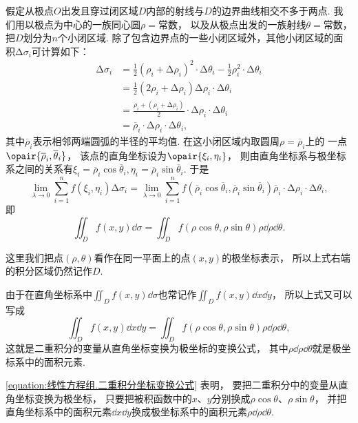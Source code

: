 假定从极点\(O\)出发且穿过闭区域\(D\)内部的射线与\(D\)的边界曲线相交不多于两点.
我们用以极点为中心的一族同心圆\(\rho = \text{常数}\)，
以及从极点出发的一族射线\(\theta = \text{常数}\)，
把\(D\)划分为\(n\)个小闭区域.
除了包含边界点的一些小闭区域外，其他小闭区域的面积\(\increment\sigma_i\)可计算如下：
\begin{align*}
	\increment\sigma_i
	&= \frac{1}{2} (\rho_i+\increment\rho_i)^2 \cdot \increment\theta_i
	- \frac{1}{2} \rho_i^2 \cdot \increment\theta_i \\
	&= \frac{1}{2} (2\rho_i + \increment\rho_i) \increment\rho_i \cdot \increment\theta_i \\
	&= \frac{\rho_i + (\rho_i+\increment\rho_i)}{2}
		\cdot \increment\rho_i \cdot \increment\theta_i \\
	&= \overline{\rho}_i \cdot \increment\rho_i \cdot \increment\theta_i,
\end{align*}
其中\(\overline{\rho}_i\)表示相邻两端圆弧的半径的平均值.
在这小闭区域内取圆周\(\rho = \overline{\rho}_i\)上的
一点\(\opair{\overline{\rho}_i,\overline{\theta}_i}\)，
该点的直角坐标设为\(\opair{\xi_i,\eta_i}\)，
则由直角坐标系与极坐标系之间的关系有\(\xi_i = \overline{\rho}_i \cos\overline{\theta}_i,
\eta_i = \overline{\rho}_i \sin\overline{\theta}_i\).
于是\[
	\lim_{\lambda\to0} \sum_{i=1}^n f(\xi_i,\eta_i) \increment\sigma_i
	= \lim_{\lambda\to0} \sum_{i=1}^n
	f(\overline{\rho}_i \cos\overline{\theta}_i,\overline{\rho}_i \sin\overline{\theta}_i)
	\overline{\rho}_i \cdot \increment\rho_i \cdot \increment\theta_i,
\]
即\[
	\iint_D f(x,y) \dd{\sigma}
	= \iint_D f(\rho\cos\theta,\rho\sin\theta) \rho \dd{\rho} \dd{\theta}.
\]

这里我们把点\((\rho,\theta)\)看作在同一平面上的点\((x,y)\)的极坐标表示，
所以上式右端的积分区域仍然记作\(D\).

由于在直角坐标系中\(\iint_D f(x,y) \dd{\sigma}\)也常记作\(\iint_D f(x,y) \dd{x} \dd{y}\)，
所以上式又可以写成
\begin{equation}\label{equation:线性方程组.二重积分坐标变换公式}
\iint_D f(x,y) \dd{x} \dd{y}
= \iint_D f(\rho\cos\theta,\rho\sin\theta) \rho \dd{\rho} \dd{\theta},
\end{equation}
这就是二重积分的变量从直角坐标变换为极坐标的变换公式，
其中\(\rho \dd{\rho} \dd{\theta}\)就是极坐标系中的面积元素.

\cref{equation:线性方程组.二重积分坐标变换公式} 表明，
要把二重积分中的变量从直角坐标变换为极坐标，
只要把被积函数中的\(x\)、\(y\)分别换成\(\rho \cos\theta\)、\(\rho \sin\theta\)，
并把直角坐标系中的面积元素\(\dd{x} \dd{y}\)换成极坐标系中的面积元素\(\rho \dd{\rho} \dd{\theta}\).

